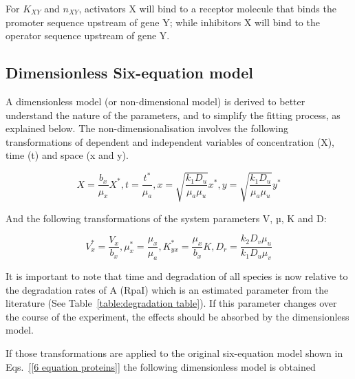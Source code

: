 For $K_{XY}$ and $n_{XY}$, activators X will bind to a receptor molecule that binds the promoter sequence upstream of gene Y; while inhibitors X will bind to the operator sequence upstream of gene Y.



\subsection{Dimensionless Six-equation model}

A dimensionless model (or non-dimensional model) is derived to better understand the nature of the parameters, and to simplify the fitting process, as explained below.
The non-dimensionalisation involves the following transformations of dependent and independent variables of concentration (X), time (t) and space (x and y).


\begin{equation}\label{variable transformations}
    X = \frac{b_{x}}{\mu_{x}}X^*, t = \frac{t^*}{\mu_{a}},
    x = \sqrt{\frac{k_{1}D_{u}}{\mu_{a}\mu_{u}}}x^*, y = \sqrt{\frac{k_{1}D_{u}}{\mu_{a}\mu_{u}}}y^*
\end{equation}

And the following transformations of the system parameters V, µ, K and D:

\begin{equation}\label{parameter transformations}
    V_{x}^*=\frac{V_{x}}{b_{x}},  \mu_{x}^* = \frac{\mu_{x}}{\mu_{a}}, K^*_{yx} = \frac{\mu_{x}}{b_{x}}K ,D_{r} = \frac{k_{2}D_{v}\mu_{u}}{k_{1}D_{u}\mu_{v}}
\end{equation}

It is important to note that time and degradation of all species is now relative to the degradation rates of A (RpaI) which is an estimated parameter from the literature (See Table~\ref{table:degradation table}).
If this parameter changes over the course of the experiment, the effects should be absorbed by the dimensionless model.

If those transformations are applied to the original six-equation model shown in Eqs.~\ref{[6 equation proteins]} the following dimensionless model is obtained

